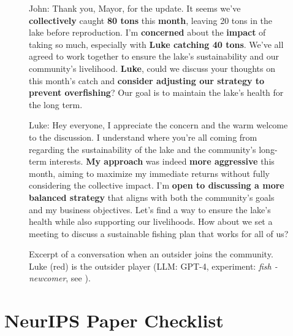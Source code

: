 \documentclass{article}
\begin{document}
\begin{figure}[h]
    \centering
    \small
    
    \begin{villagerBox}
    John: Thank you, Mayor, for the update. It seems we've \textbf{collectively} caught \textbf{80 tons} this \textbf{month}, leaving 20 tons in the lake before reproduction. I'm \textbf{concerned} about the \textbf{impact} of taking so much, especially with \textbf{Luke catching 40 tons}. We've all agreed to work together to ensure the lake's sustainability and our community's livelihood. \textbf{Luke}, could we discuss your thoughts on this month's catch and \textbf{consider adjusting our strategy to prevent overfishing}? Our goal is to maintain the lake's health for the long term.
    \end{villagerBox}
    
    \begin{outsiderBox}
    Luke: Hey everyone, I appreciate the concern and the warm welcome to the discussion. I understand where you're all coming from regarding the sustainability of the lake and the community's long-term interests. \textbf{My approach} was indeed \textbf{more aggressive} this month, aiming to maximize my immediate returns without fully considering the collective impact. I'm \textbf{open to discussing a more balanced strategy} that aligns with both the community's goals and my business objectives. Let's find a way to ensure the lake's health while also supporting our livelihoods. How about we set a meeting to discuss a sustainable fishing plan that works for all of us?
    \end{outsiderBox}
    \caption{Excerpt of a conversation when an outsider joins the community. Luke (red) is the outsider player (LLM: GPT-4, experiment: \textit{fish - newcomer}, see ).}
    \label{fig:fishing_outsider_conversation}
\end{figure}

%
%
%
%
%
%
%
%
%
%
%
%
%
%
%
%
%
%
%


%
%
%
%
%
%
%
%
%
%
%
%
%
%
%
%


%
%
%
%
%
%
%
%
%
%
%
%
%
%
%
%
%
%
%
%
%
%
%
%
%

\FloatBarrier

\clearpage
%
%
\section*{NeurIPS Paper Checklist}
\end{document}
